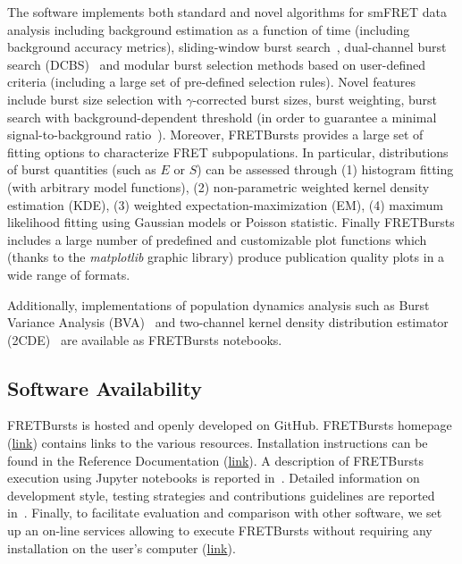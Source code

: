 \documentclass[10pt,letterpaper]{article}
\begin{document}
The software implements both standard and novel algorithms for smFRET data analysis
including background estimation as a function of time (including background accuracy
metrics), sliding-window burst search~\cite{Eggeling_1998},
dual-channel burst search (DCBS)~\cite{Nir_2006} and
modular burst selection methods based on user-defined criteria
(including a large set of pre-defined selection rules). Novel features include burst size
selection with $\gamma$-corrected burst sizes, burst weighting, burst search with
background-dependent threshold (in order to guarantee a minimal signal-to-background
ratio~\cite{Michalet_2012}).
Moreover, FRETBursts provides a large set of fitting options to characterize FRET subpopulations.
In particular, distributions of burst quantities (such as $E$ or $S$) can be assessed
through (1) histogram fitting (with arbitrary model functions),
(2) non-parametric weighted kernel density estimation (KDE), (3) weighted
expectation-maximization (EM), (4) maximum likelihood fitting using Gaussian models
or Poisson statistic. Finally FRETBursts includes a large number of
predefined and customizable plot functions which (thanks to the \textit{matplotlib}
graphic library) produce publication quality plots in a wide range of formats.

Additionally, implementations of population dynamics analysis such
as Burst Variance Analysis (BVA)~\cite{Torella_2011} and two-channel
kernel density distribution estimator (2CDE)~\cite{Tomov_2012}
are available as FRETBursts notebooks.

\subsection*{Software Availability}
FRETBursts is hosted and openly developed on GitHub. FRETBursts homepage
(\href{http://tritemio.github.io/FRETBursts}{link})
contains links to the various resources. Installation instructions can be found in the
Reference Documentation (\href{http://fretbursts.readthedocs.org/en/latest/getting_started.html}{link}).
A description of FRETBursts execution using Jupyter notebooks is reported
in~. %
Detailed information on development style, testing strategies and
contributions guidelines are reported in~. %
Finally, to facilitate evaluation and comparison with other software,
we set up an on-line services allowing to execute FRETBursts
without requiring any installation on the user's computer (\href{https://github.com/tritemio/FRETBursts_notebooks#run-online}{link}).
\end{document}
